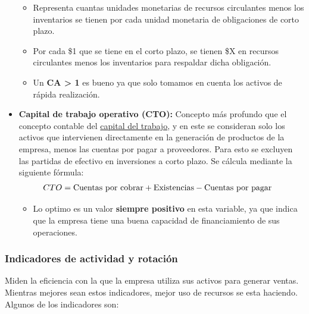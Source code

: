 \documentclass{templateNote}
\begin{document}
\begin{itemize}
    \begin{itemize}
        \item Representa cuantas unidades monetarias de recursos circulantes menos los inventarios se tienen por cada unidad monetaria de obligaciones de corto plazo.
        \item Por cada \$1 que se tiene en el corto plazo, se tienen \$X en recursos circulantes menos los inventarios para respaldar dicha obligación.
        \item Un \textbf{CA > 1} es bueno ya que solo tomamos en cuenta los activos de rápida realización.
    \end{itemize}

    \item\textbf{Capital de trabajo operativo (CTO):}
    \noindent Concepto más profundo que el concepto contable del \hyperref[sec:Capital neto del trabajo (CNT)]{capital del trabajo}, y en este se consideran solo los activos que intervienen directamente
    en la generación de productos de la empresa, menos las cuentas por pagar a proveedores. Para esto se excluyen las partidas de efectivo en inversiones a corto plazo. Se cálcula mediante la siguiente fórmula:
    \begin{align*}
        CTO &= \textnormal{Cuentas por cobrar} + \textnormal{Existencias} - \textnormal{Cuentas por pagar}
    \end{align*}

    \begin{itemize}
        \item Lo optimo es un valor \textbf{siempre positivo} en esta variable, ya que indica que la empresa tiene una buena capacidad de financiamiento de sus operaciones.
    \end{itemize}
\end{itemize}

\subsubsection{Indicadores de actividad y rotación}
\noindent Miden la eficiencia con la que la empresa utiliza sus activos para generar ventas. Mientras mejores sean estos indicadores, mejor uso de recursos se esta haciendo. Algunos de los indicadores son:
\end{document}
